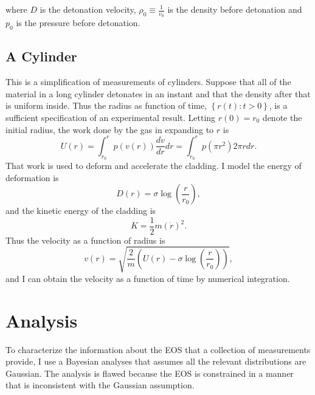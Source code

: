 \documentclass[11pt]{article}
\begin{document}
where $D$ is the detonation velocity, $\rho_0\equiv\frac{1}{v_0}$ is
the density before detonation and $p_0$ is the pressure before
detonation.



\subsection{A Cylinder}
\label{sec:cylinder}

This is a simplification of measurements of cylinders.  Suppose that
all of the material in a long cylinder detonates in an instant and
that the density after that is uniform inside.  Thus the radius as
function of time, $\left\{r(t): t>0 \right\}$, is a sufficient
specification of an experimental result.  Letting $r(0) = r_0$ denote
the initial radius, the work done by the gas in expanding to $r$ is
\begin{equation*}
  U(r) = \int_{r_0}^r p(v(r)) \frac{dv}{dr} dr = \int_{r_0}^r p(\pi
  r^2) 2\pi r dr.
\end{equation*}
That work is used to deform and accelerate the cladding.  I model the
energy of deformation is
\begin{equation*}
  D(r) = \sigma \log \left(\frac{r}{r_0} \right),
\end{equation*}
and the kinetic energy of the cladding is
\begin{equation*}
  K = \frac{1}{2} m \left( \dot r \right)^2.
\end{equation*}
Thus the velocity as a function of radius is
\begin{equation*}
  v(r) = \sqrt{\frac{2}{m} \left( U(r) - \sigma \log
      \left(\frac{r}{r_0} \right) \right) },
\end{equation*}
and I can obtain the velocity as a function of time by numerical
integration.

\section{Analysis}
\label{sec:analysis}

To characterize the information about the EOS that a collection of
measurements provide, I use a Bayesian analyses that assumes all the
relevant distributions are Gaussian.  The analysis is flawed because
the EOS is constrained in a manner that is inconsistent with the
Gaussian assumption.
\end{document}

